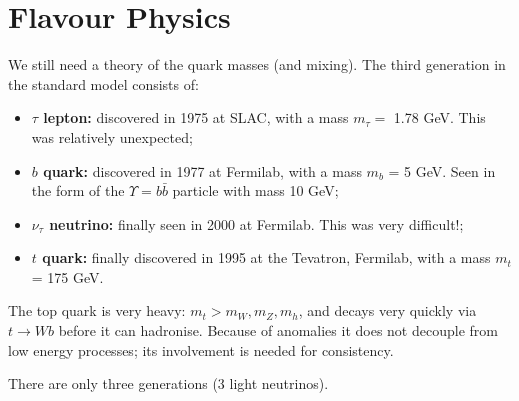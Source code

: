 \section{Flavour Physics}
%
We still need a theory of the quark masses (and mixing). The third generation in the standard model consists of:
\begin{itemize}
\item \textbf{$\tau$ lepton: } discovered in 1975 at SLAC, with a mass $m_\tau = $ 1.78 GeV. This was relatively unexpected;
\item \textbf{$b$ quark: } discovered in 1977 at Fermilab, with a mass $m_b$ = 5 GeV. Seen in the form of the $\Upsilon = b\bar{b}$ particle with mass 10 GeV;
\item \textbf{$\nu_\tau$ neutrino: } finally seen in 2000 at Fermilab. This was very difficult!;
\item \textbf{$t$ quark: } finally discovered in 1995 at the Tevatron, Fermilab, with a mass $m_t$ = 175 GeV.
\end{itemize}
The top quark is very heavy: $m_t > m_W, m_Z, m_h$, and decays very quickly via $t \to Wb$ before it can hadronise. Because of anomalies it does not decouple from low energy processes; its involvement is needed for consistency.

There are only three generations (3 light neutrinos).
%
